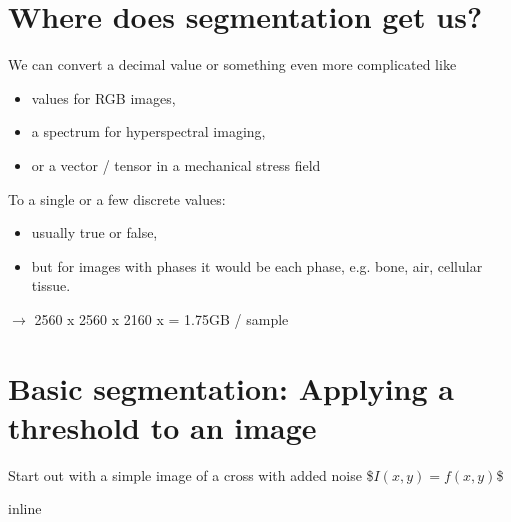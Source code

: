 \documentclass[letterpaper,10pt,english]{sphinxmanual}
\begin{document}
\section{Where does segmentation get us?}
\label{\detokenize{04-BasicSegmentation:where-does-segmentation-get-us}}
\sphinxAtStartPar
We can convert a decimal value or something even more complicated like
\begin{itemize}
\item {} 
 values for RGB images,

\item {} 
\sphinxAtStartPar
a spectrum for hyperspectral imaging,

\item {} 
\sphinxAtStartPar
or a vector / tensor in a mechanical stress field

\end{itemize}

\sphinxAtStartPar
To a single or a few discrete values:
\begin{itemize}
\item {} 
\sphinxAtStartPar
usually true or false,

\item {} 
\sphinxAtStartPar
but for images with phases it would be each phase, e.g. bone, air, cellular tissue.

\end{itemize}

\sphinxAtStartPar
{} \(\rightarrow\) 2560 x 2560 x 2160 x  = 1.75GB / sample


\section{Basic segmentation: Applying a threshold to an image}
\label{\detokenize{04-BasicSegmentation:basic-segmentation-applying-a-threshold-to-an-image}}
\sphinxAtStartPar
Start out with a simple image of a cross with added noise
\$\( I(x,y) = f(x,y) \)\$

\begin{sphinxVerbatim}[commandchars=\\\{\}]
 inline
   
   
\end{sphinxVerbatim}
\end{document}
